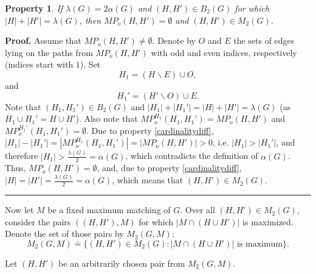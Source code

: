\documentclass[a4paper, 12pt]{article}
\newtheorem{property}[definition]{Property}
\newenvironment{proof}[1][Proof]{\noindent\textbf{#1.} }{\ \rule{0.5em}{0.5em}}
\begin{document}
\begin{property} \label{lambda=2alpha}
If $\lambda(G) = 2\alpha(G)$ and $(H,H') \in B_2(G)$ for which $|H|
+ |H'| = \lambda(G)$, then $MP_o(H,H') = \emptyset$ and $(H,H') \in
M_2(G)$.
\end{property}
\begin{proof}
Assume that $MP_o(H,H') \neq \emptyset$. Denote by $O$ and $E$ the
sets of edges lying on the paths from $MP_o(H,H')$ with odd and even
indices, respectively (indices start with $1$). Set
$$H_1 = (H \backslash E) \cup O,$$
and
$$H_1' = (H' \backslash O) \cup E.$$
Note that $(H_1, H_1') \in B_2(G)$ and $|H_1| + |H_1'| = |H| + |H'|
= \lambda(G)$ (as $H_1 \cup H_1' = H \cup H'$). Also note that
$MP_o^{H_1}(H_1, H_1') = MP_o(H, H')$ and $MP_o^{H_1'}(H_1, H_1') =
\emptyset$. Due to property \ref{cardinalitydiff}, $|H_1| - |H_1'| =
|MP_o^{H_1}(H_1, H_1')| = |MP_o(H, H')| > 0$, i.e. $|H_1| > |H_1'|$,
and therefore $|H_1| > \frac{\lambda(G)}{2} = \alpha(G)$, which
contradicts the definition of $\alpha(G)$. Thus, $MP_o(H,H') =
\emptyset$, and, due to property \ref{cardinalitydiff}, $|H| = |H'|
= \frac{\lambda(G)}{2} = \alpha(G)$, which means that $(H,H') \in
M_2(G)$.
\end{proof}



\bigskip

Now let $M$ be a fixed maximum matching of $G$. Over all $(H,H')\in
M_{2}(G)$, consider the pairs $((H,H'),M)$ for which $|M \cap (H
\cup H')|$ is maximized. Denote the set of those pairs by $M_2(G,
M)$:
$$M_2(G, M) \doteq \{(H,H') \in M_{2}(G) : |M \cap (H \cup H')| \text{ is maximum} \}.$$

Let $(H,H')$ be an arbitrarily chosen pair from $M_2(G, M)$.
\end{document}
